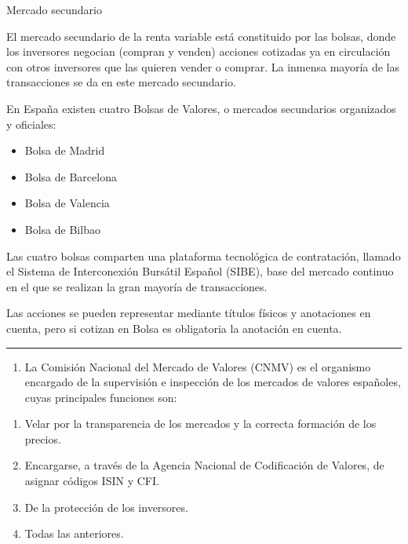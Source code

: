 \documentclass[
  letterpaper,
  DIV=11,
  numbers=noendperiod]{scrreprt}
\providecommand{\tightlist}{%
  \setlength{\itemsep}{0pt}\setlength{\parskip}{0pt}}\usepackage{longtable,booktabs,array}
\begin{document}
\begin{tcolorbox}[enhanced jigsaw, left=2mm, opacityback=0, colback=white, breakable, arc=.35mm, bottomrule=.15mm, rightrule=.15mm, toprule=.15mm, leftrule=.75mm, colframe=quarto-callout-tip-color-frame]
\begin{minipage}[t]{\textwidth - 5.5mm}
Mercado secundario

El mercado secundario de la renta variable está constituido por las
bolsas, donde los inversores negocian (compran y venden) acciones
cotizadas ya en circulación con otros inversores que las quieren vender
o comprar. La inmensa mayoría de las transacciones se da en este mercado
secundario.

En España existen cuatro Bolsas de Valores, o mercados secundarios
organizados y oficiales:

\begin{itemize}
\item
  Bolsa de Madrid
\item
  Bolsa de Barcelona
\item
  Bolsa de Valencia
\item
  Bolsa de Bilbao
\end{itemize}

Las cuatro bolsas comparten una plataforma tecnológica de contratación,
llamado el Sistema de Interconexión Bursátil Español (SIBE), base del
mercado continuo en el que se realizan la gran mayoría de transacciones.

Las acciones se pueden representar mediante títulos físicos y
anotaciones en cuenta, pero si cotizan en Bolsa es obligatoria la
anotación en cuenta.

\end{minipage}%
\end{tcolorbox}

\begin{center}\rule{0.5\linewidth}{0.5pt}\end{center}

\begin{enumerate}
\def\labelenumi{\arabic{enumi}.}
\setcounter{enumi}{1}
\tightlist
\item
  La Comisión Nacional del Mercado de Valores (CNMV) es el organismo
  encargado de la supervisión e inspección de los mercados de valores
  españoles, cuyas principales funciones son:
\end{enumerate}

\begin{enumerate}
\def\labelenumi{\alph{enumi})}
\item
  Velar por la transparencia de los mercados y la correcta formación de
  los precios.
\item
  Encargarse, a través de la Agencia Nacional de Codificación de
  Valores, de asignar códigos ISIN y CFI.
\item
  De la protección de los inversores.
\item
  Todas las anteriores.
\end{enumerate}
\end{document}
